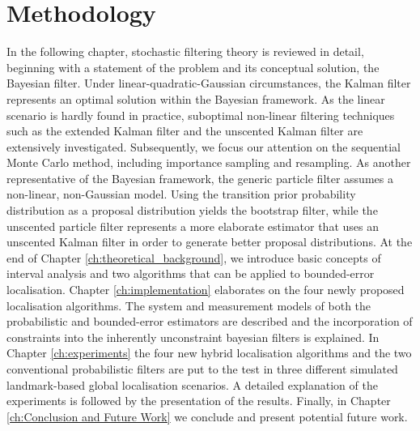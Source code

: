 \section{Methodology}

In the following chapter, stochastic filtering theory is reviewed in detail, beginning with a statement of the problem and its conceptual solution, the Bayesian filter. Under linear-quadratic-Gaussian circumstances, the Kalman filter represents an optimal solution within the Bayesian framework. As the linear scenario is hardly found in practice, suboptimal non-linear filtering techniques such as the extended Kalman filter and the unscented Kalman filter are extensively investigated. Subsequently, we focus our attention on the sequential Monte Carlo method, including importance sampling and resampling. As another representative of the Bayesian framework, the generic particle filter assumes a non-linear, non-Gaussian model. Using the transition prior probability distribution as a proposal distribution yields the bootstrap filter, while the unscented particle filter represents a more elaborate estimator that uses an unscented Kalman filter in order to generate better proposal distributions. At the end of Chapter \ref{ch:theoretical_background}, we introduce basic concepts of interval analysis and two algorithms that can be applied to bounded-error localisation. Chapter \ref{ch:implementation} elaborates on the four newly proposed localisation algorithms. The system and measurement models of both the probabilistic and bounded-error estimators are described and the incorporation of constraints into the inherently unconstraint bayesian filters is explained. In Chapter \ref{ch:experiments} the four new hybrid localisation algorithms and the two conventional probabilistic filters are put to the test in three different simulated landmark-based global localisation scenarios. A detailed explanation of the experiments is followed by the presentation of the results. Finally, in Chapter \ref{ch:Conclusion and Future Work} we conclude and present potential future work.




